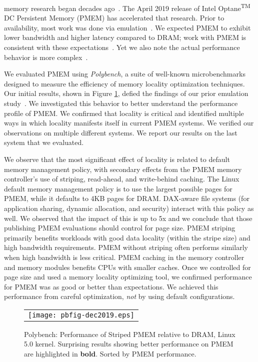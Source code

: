  memory research began decades ago~\cite{wu1994envy}.
The April 2019 release of Intel Optane\textsuperscript{\tiny TM} DC Persistent Memory (PMEM) has accelerated
that research. Prior to availability, most work was done via emulation~\cite{wu1994envy,Maciejewski2017persistent,dulloor2014system,volos2015quartz,doudali2017comerge}.  We expected PMEM to exhibit lower bandwidth and higher latency compared to DRAM; work with PMEM is consistent with these expectations~\cite{gill2019single,izraelevitz2019basic}.  Yet we also note the actual performance behavior is more complex~\cite{peng2019system}. 

We evaluated PMEM using \textit{Polybench}, a suite of well-known microbenchmarks designed to measure the efficiency of memory locality optimization techniques.  Our initial results, shown in Figure \ref{fig:polybench}, defied the findings of our prior emulation study~\cite{doudali2017comerge}.  We investigated this behavior to better understand the performance profile of PMEM. We confirmed that locality is critical and identified multiple ways in which locality manifests itself in current PMEM systems.  We verified our observations on multiple different systems.  We report our results on the last system that we evaluated.

We observe that the most significant effect of locality is related to default memory management policy, with secondary effects from the PMEM memory controller's use of striping, read-ahead, and write-behind caching.  The Linux default memory management policy is to use the largest possible pages for PMEM, while it defaults to 4KB pages for DRAM.  DAX-aware file systems (for application sharing, dynamic allocation, and security) interact with this policy as well.  We observed that the impact of this is up to 5x and we conclude that those publishing  PMEM evaluations should control for page size. PMEM striping primarily benefits workloads with good data locality (within the stripe size) and high bandwidth requirements.  PMEM without striping often performs similarly when high bandwidth is less critical.  PMEM caching in the memory controller and memory modules benefits CPUs with smaller caches.  Once we controlled for page size and used a memory locality optimizing tool, we confirmed performance for PMEM was as good or better than expectations.  We achieved this performance from careful optimization, \textit{not} by using default configurations.

\begin{figure}[!htb]
    \captionsetup{justification=centering}
    \centering
    \caption{Polybench: Performance of Striped PMEM relative to DRAM, Linux 5.0 kernel.  Surprising results showing better performance on PMEM are highlighted in \textbf{bold}. Sorted by PMEM performance.}
    \vspace{0.1cm}
    \label{fig:polybench}
    \begin{tabular}{c}
        \texttt{[image: pbfig-dec2019.eps]}
    \end{tabular}
\end{figure}

